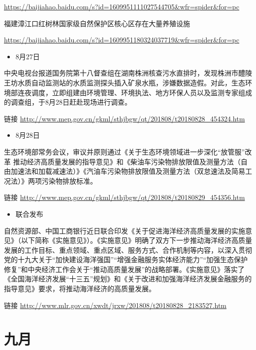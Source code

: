 \documentclass[
]{book}
\providecommand{\tightlist}{%
  \setlength{\itemsep}{0pt}\setlength{\parskip}{0pt}}
\begin{document}
\url{https://baijiahao.baidu.com/s?id=1609951111027544705\&wfr=spider\&for=pc}

福建漳江口红树林国家级自然保护区核心区存在大量养殖设施

\url{https://baijiahao.baidu.com/s?id=1609951180324037719\&wfr=spider\&for=pc}

\begin{itemize}
\tightlist
\item
  8月27日
\end{itemize}

中央电视台报道国务院第十八督查组在湖南株洲核查污水直排时，发现株洲市醴陵王坊水质自动监测站的水质监测探头插入矿泉水瓶，涉嫌数据造假。对此，生态环境部连夜调度，立即组建由环境管理、环境执法、地方环保人员以及监测专家组成的调查组，于8月28日赶赴现场进行调查。

链接 \url{http://www.mep.gov.cn/gkml/sthjbgw/qt/201808/t20180828_454324.htm}

\begin{itemize}
\tightlist
\item
  8月28日
\end{itemize}

生态环境部常务会议，审议并原则通过《关于生态环境领域进一步深化``放管服''改革 推动经济高质量发展的指导意见》和《柴油车污染物排放限值及测量方法（自由加速法和加载减速法）》《汽油车污染物排放限值及测量方法（双怠速法及简易工况法）》两项污染物排放标准。

链接 \url{http://www.mep.gov.cn/gkml/sthjbgw/qt/201808/t20180829_454356.htm}

\begin{itemize}
\tightlist
\item
  联合发布
\end{itemize}

自然资源部、中国工商银行近日联合印发《关于促进海洋经济高质量发展的实施意见》（以下简称《实施意见》）。《实施意见》明确了双方下一步推动海洋经济高质量发展的工作目标、重点领域、重点区域、服务方式、合作机制等内容，以深入贯彻党的十九大关于``加快建设海洋强国''``增强金融服务实体经济能力''``加强生态保护修复''和中央经济工作会关于``推动高质量发展''的战略部署。《实施意见》落实了《全国海洋经济发展``十三五''规划》和《关于改进和加强海洋经济发展金融服务的指导意见》要求，将推动海洋经济的高质量发展。

链接 \url{http://www.mlr.gov.cn/xwdt/jrxw/201808/t20180828_2183527.htm}

\hypertarget{ux4e5dux6708}{%
\section*{九月}\label{ux4e5dux6708}}
\end{document}
